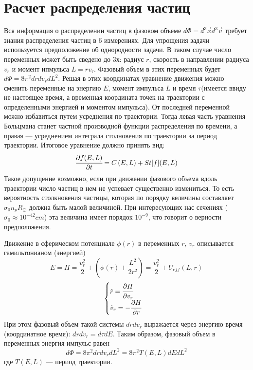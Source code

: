 \section{Расчет распределения частиц}

Вся информация о распределении частиц в фазовом объеме $d\Phi = d^{3}\vec{x}d^{3}\vec{v}$
требует знания распределения частиц в 6 измерениях. Для упрощения задачи используется
предположение об однородности задачи. В таком случае число переменных может быть сведено 
до 3х: радиус $r$, скорость в направлении радиуса $v_r$ и момент ипмульса $L = r v_{\tau}$.
Фазовый объем в этих переменных будет $d\Phi = 8\pi^{2}drdv_{r}dL^{2}$. Решая в этих
координатах уравнение движения можно сменить переменные на энергию $E$, момент 
импульса $L$ и время $\tau$(имеется ввиду не настоящее время, а временная координата точек на траектории с определенными энергией и моментом импульса). От последней переменной можно
избавиться путем усреднения по траектории. Тогда левая часть уравнения Больцмана станет
частной производной функции распределения по времени, а правая --- усреднением интеграла столновения по траектории за период траектории. Итоговое уравнение должно принять вид:
\begin{equation}
	\label{eq:boltsman_EL}
	\cfrac{\partial f(E,L)}{\partial t} = C\left( {E,L} \right) + St\lbrack f\rbrack(E,L)
\end{equation}
Такое допущение возможно, если при движении фазового объема вдоль траектории число 
частиц в нем не успевает существенно измениться. То есть вероятность столкновения частицы,
которая по порядку величины составляет $\sigma_0 n_p R_{\odot}$ должна быть малой величиной. При интересующих нас сечениях ($\sigma_0 \approx 10^{-42} cm$) эта величина 
имеет порядок $10^{-9}$, что говорит о верности предположения.

Движение в сферическом потенциале $\phi(r)$ в переменных $r$, $v_r$ описывается гамильтонианом (энергией)
\begin{equation}
	\label{eq:move_hamiltonian}	
	E = H = \frac{v_{r}^{2}}{2} + \left( {\phi(r) + \frac{L^{2}}{2r^{2}}} \right) = \frac{v_{r}^{2}}{2} + U_{eff}(L,r)
\end{equation}
\begin{equation}
	\label{eq:move_equations}
	\begin{cases}
		\dot{r} = \cfrac{\partial H}{\partial v_r}\\
		\dot{v}_r= -\cfrac{\partial H}{\partial r}
	\end{cases}
\end{equation}
При этом фазовый объем такой системы $drdv_r$ выражается через энергию-время (координатное время): $drdv_r = d\tau dE$. Таким образом, фазовый объем в переменных энергия-импульс равен
\begin{equation}
	\label{eq:phase_volume_EL}
	d\Phi = 8\pi^{2}drdv_{r}dL^{2} = 8\pi^{2}T(E,L)dEdL^2
\end{equation}
где $T(E,L)$ --- период траектории.

